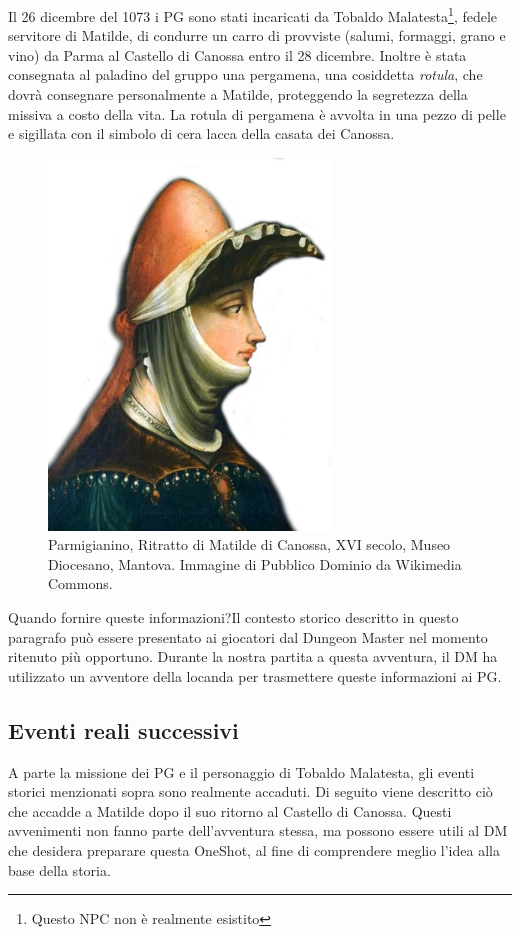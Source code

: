 \documentclass[letterpaper,twocolumn,openany,nodeprecatedcode]{dndbook}
\begin{document}
Il 26 dicembre del 1073 i PG sono stati incaricati da Tobaldo Malatesta\footnote{Questo NPC non è realmente esistito}, fedele servitore di Matilde, di condurre un carro di provviste (salumi, formaggi, grano e vino) da Parma al Castello di Canossa entro il 28 dicembre. Inoltre è stata consegnata al paladino del gruppo  una pergamena, una cosiddetta \textit{rotula}, che dovrà consegnare personalmente a Matilde, proteggendo la segretezza della missiva a costo della vita. La rotula di pergamena è avvolta in una pezzo di pelle e sigillata con il simbolo di cera lacca della casata dei Canossa. 

\begin{figure}
\centering
\includegraphics[width=7.5cm]{img/matilde.png}
    \caption{\textsf{Parmigianino, Ritratto di Matilde di Canossa, XVI secolo, Museo Diocesano, Mantova. Immagine di Pubblico Dominio da Wikimedia Commons.}}
    \label{fig:matilde}
\end{figure}

\begin{DndSidebar}{Quando fornire queste informazioni?}Il contesto storico descritto in questo paragrafo può essere presentato ai giocatori dal Dungeon Master nel momento ritenuto più opportuno. Durante la nostra partita a questa avventura, il DM ha utilizzato un avventore della locanda per trasmettere queste informazioni ai PG.
\end{DndSidebar}

\subsection{Eventi reali successivi}
A parte la missione dei PG e il personaggio di Tobaldo Malatesta, gli eventi storici menzionati sopra sono realmente accaduti. Di seguito viene descritto ciò che accadde a Matilde dopo il suo ritorno al Castello di Canossa. Questi avvenimenti non fanno parte dell'avventura stessa, ma possono essere utili al DM che desidera preparare questa OneShot, al fine di comprendere meglio l'idea alla base della storia.
\end{document}
